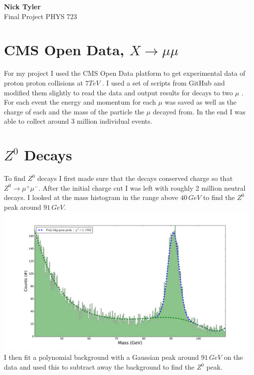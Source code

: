 \documentclass[a4paper, 11pt]{article}
\begin{document}
\noindent
\large\textbf{Nick Tyler} \hfill \\
\normalsize Final Project \hfill PHYS 723 \\

\section*{CMS Open Data, $X \rightarrow  \mu \mu$ } 
For my project I used the CMS Open Data platform to get experimental data of proton proton collisions at $7 TeV$ \cite{OpenData}.  I used a set of scripts from GitHub and modified them slightly to read the data and output results for decays to two $\mu$ \cite{GitHub}. For each event the energy and momentum for each $\mu$ was saved as well as the charge of each and the mass of the particle the $\mu$ decayed from. In the end I was able to collect around 3 million individual events.

\section*{$Z^0$ Decays}
To find $Z^0$ decays I first made sure that the decays conserved charge so that $Z^0 \rightarrow  \mu^+ \mu^-$. After the initial charge cut I was left with roughly 2 million neutral decays.  I looked at the mass histogram in the range above $40\,GeV$ to find the $Z^0$ peak around $91\,GeV$.\\
\includegraphics[width=\textwidth]{Z_stuff/Mass_histogram.pdf} \\

I then fit a polynomial background with a Gaussian peak around $91\,GeV$ on the data and used this to subtract away the background to find the $Z^0$ peak. \\
\end{document}
